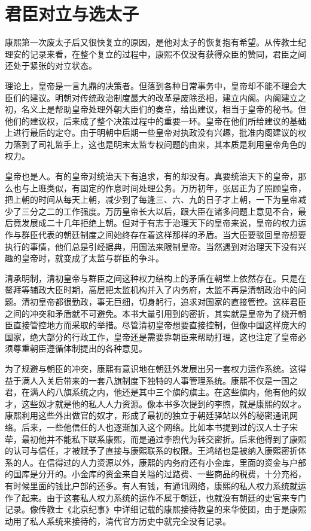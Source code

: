 \section{君臣对立与选太子}


康熙第一次废太子后又很快复立的原因，是他对太子的恢复抱有希望。从传教士纪理安的记录来看，在整个复立的过程中，康熙不仅没有获得众臣的赞同，君臣之间还处于紧张的对立状态。



理论上，皇帝是一言九鼎的决策者。但落到各种日常事务中，皇帝却不能不理会大臣们的建议。明朝对传统政治制度最大的改革是废除丞相，建立内阁。内阁建立之初，名义上是帮助皇帝处理外朝大臣们的奏章，给出建议，相当于皇帝的秘书。但他们的建议权，后来成了整个决策过程中的重要一环。皇帝在他们所给建议的基础上进行最后的定夺。由于明朝中后期一些皇帝对执政没有兴趣，批准内阁建议的权力落到了司礼监手上，这也是明末太监专权问题的由来，其本质是利用皇帝角色的权力。



皇帝也是人。有的皇帝对统治天下有追求，有的却没有。真要统治天下的皇帝，那么也与上班类似，有固定的作息时间处理公务。万历初年，张居正为了照顾皇帝，把上朝的时间从每天上朝，减少到了每逢三、六、九的日子才上朝，一下为皇帝减少了三分之二的工作强度。万历皇帝长大以后，跟大臣在诸多问题上意见不合，最后竟发展成二十几年拒绝上朝。但对于有志于治理天下的皇帝来说，皇帝的权力运作与群臣代表的朝廷制度之间始终存在着这样那样的矛盾。当大臣要驳回皇帝想要执行的事情，他们总是引经据典，用国法来限制皇帝。当然遇到对治理天下没有兴趣的皇帝时，就变成了太监与群臣的争斗。



清承明制，清初皇帝与群臣之间这种权力结构上的矛盾在朝堂上依然存在。只是在鳌拜等辅政大臣时期，高层把太监机构并入了内务府，太监不再是清朝政治中的问题。清初皇帝都很勤政，事无巨细，切身躬行，追求对国家的直接管控。这样君臣之间的冲突和矛盾就不可避免。本书大量引用到的密折，其实就是皇帝为了绕开朝臣直接管控地方而采取的举措。尽管清初皇帝想要直接控制，但像中国这样庞大的国家，绝大部分的行政工作，皇帝还是需要靠朝臣来帮助打理，这也注定了皇帝必须尊重朝臣遵循体制提出的各种意见。



为了规避与朝臣的冲突，康熙有意识地在朝廷外发展出另一套权力运作系统。这得益于满人入关后带来的一套八旗制度下独特的人事管理系统。康熙不仅是一国之君，在满人的八旗系统之内，他还是其中三个旗的旗主。在这些旗内，他有他的奴才，这些奴才就是他的私人人力资源。像本书多次提到的李煦，就是康熙的奴才。康熙利用这些外出做官的奴才，形成了最初的独立于朝廷驿站以外的秘密通讯网络。后来，一些他信任的人也逐渐加入这个网络。比如本书提到过的汉人士子宋荦，最初他并不能私下联系康熙，而是通过李煦代为转交密折。后来他得到了康熙的认可与信任，才被赋予了直接与康熙联系的权限。王鸿绪也是被纳入康熙密折体系的人。在信得过的人力资源以外，康熙的内务府还有小金库，里面的资金与户部的国库是分开的。小金库的资金来自关隘的过路费、一些商品的税费，十分充裕，有时候里面的钱比户部的还多。有人有钱，有通讯网络，康熙的私人权力系统就运作了起来。由于这套私人权力系统的运作不属于朝廷，也就没有朝廷的史官来专门记录。像传教士《北京纪事》中详细记载的康熙接待教皇的来华使团，由于是康熙动用了私人系统来接待的，清代官方历史中就完全没有记录。


